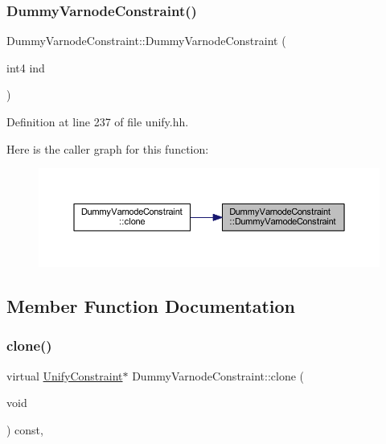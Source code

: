 \subsubsection{\texorpdfstring{DummyVarnodeConstraint()}{DummyVarnodeConstraint()}}
{\footnotesize\ttfamily Dummy\+Varnode\+Constraint\+::\+Dummy\+Varnode\+Constraint (\begin{DoxyParamCaption}\item[{int4}]{ind }\end{DoxyParamCaption})\hspace{0.3cm}{\ttfamily [inline]}}



Definition at line 237 of file unify.\+hh.

Here is the caller graph for this function\+:
\nopagebreak
\begin{figure}[H]
\begin{center}
\leavevmode
\includegraphics[width=350pt]{class_dummy_varnode_constraint_a3506beca3f9b27badaa0831446588ce9_icgraph}
\end{center}
\end{figure}


\subsection{Member Function Documentation}
\mbox{\label{class_dummy_varnode_constraint_a8a5c0d0f00ab7343a19985465e59dc4b}} 
\subsubsection{\texorpdfstring{clone()}{clone()}}
{\footnotesize\ttfamily virtual \mbox{\hyperlink{class_unify_constraint}{Unify\+Constraint}}$\ast$ Dummy\+Varnode\+Constraint\+::clone (\begin{DoxyParamCaption}\item[{void}]{ }\end{DoxyParamCaption}) const\hspace{0.3cm}{\ttfamily [inline]}, {\ttfamily [virtual]}}



